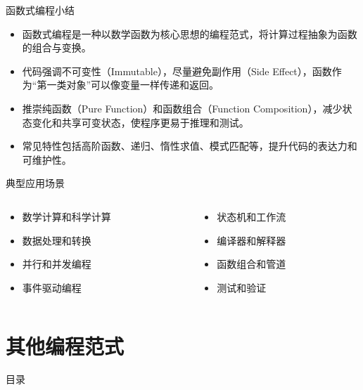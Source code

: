 \documentclass[UTF8,aspectratio=169]{beamer}
\begin{document}
\begin{frame}{函数式编程小结}
    \begin{itemize}
        \item 函数式编程是一种以数学函数为核心思想的编程范式，将计算过程抽象为函数的组合与变换。
        \item 代码强调不可变性（Immutable），尽量避免副作用（Side Effect），函数作为“第一类对象”可以像变量一样传递和返回。
        \item 推崇纯函数（Pure Function）和函数组合（Function Composition），减少状态变化和共享可变状态，使程序更易于推理和测试。
        \item 常见特性包括高阶函数、递归、惰性求值、模式匹配等，提升代码的表达力和可维护性。
    \end{itemize}
    \begin{ytublock}{典型应用场景}
        \begin{columns}
            \begin{column}{0.48\textwidth}
                \begin{itemize}
                    \item 数学计算和科学计算
                    \item 数据处理和转换
                    \item 并行和并发编程
                    \item 事件驱动编程
                \end{itemize}
            \end{column}
            \begin{column}{0.48\textwidth}
                \begin{itemize}
                    \item 状态机和工作流
                    \item 编译器和解释器
                    \item 函数组合和管道
                    \item 测试和验证
                \end{itemize}
            \end{column}
        \end{columns}
    \end{ytublock}
\end{frame}

\section{其他编程范式}
\begin{frame}{目录}
    \begin{multicols}{2}
        \tableofcontents[currentsection]
    \end{multicols}
\end{frame}
\end{document}
